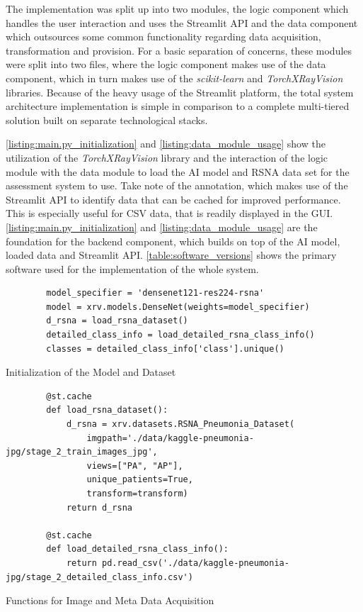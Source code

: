 \documentclass[11pt,a4paper,english]{scrreprt}
\begin{document}
The implementation was split up into two modules, the logic component which handles the user interaction and uses the Streamlit API and the data component which outsources some common functionality regarding data acquisition, transformation and provision. For a basic separation of concerns, these modules were split into two files, where the logic component makes use of the data component, which in turn makes use of the \textit{scikit-learn} and \textit{TorchXRayVision} libraries. Because of the heavy usage of the Streamlit platform, the total system architecture implementation is simple in comparison to a complete multi-tiered solution built on separate technological stacks.

\autoref{listing:main.py_initialization} and \autoref{listing:data_module_usage} show the utilization of the \textit{TorchXRayVision} library and the interaction of the logic module with the data module to load the AI model and RSNA data set for the assessment system to use. Take note of the  annotation, which makes use of the Streamlit API to identify data that can be cached for improved performance. This is especially useful for CSV data, that is readily displayed in the GUI. \autoref{listing:main.py_initialization} and \autoref{listing:data_module_usage} are the foundation for the backend component, which builds on top of the AI model, loaded data and Streamlit API. \autoref{table:software_versions} shows the primary software used for the implementation of the whole system.

\begin{listing}[htpb]
    \begin{verbatim}
        model_specifier = 'densenet121-res224-rsna'
        model = xrv.models.DenseNet(weights=model_specifier)
        d_rsna = load_rsna_dataset()
        detailed_class_info = load_detailed_rsna_class_info()
        classes = detailed_class_info['class'].unique()
    \end{verbatim}
    \caption{Initialization of the Model and Dataset}
    \label{listing:main.py_initialization}
\end{listing}

\begin{listing}[htpb]
    \begin{verbatim}
        @st.cache
        def load_rsna_dataset():
            d_rsna = xrv.datasets.RSNA_Pneumonia_Dataset(
                imgpath='./data/kaggle-pneumonia-jpg/stage_2_train_images_jpg',
                views=["PA", "AP"],
                unique_patients=True,
                transform=transform)
            return d_rsna

        @st.cache
        def load_detailed_rsna_class_info():
            return pd.read_csv('./data/kaggle-pneumonia-jpg/stage_2_detailed_class_info.csv')
    \end{verbatim}
    \caption{Functions for Image and Meta Data Acquisition}
    \label{listing:data_module_usage}
\end{listing}
\end{document}
